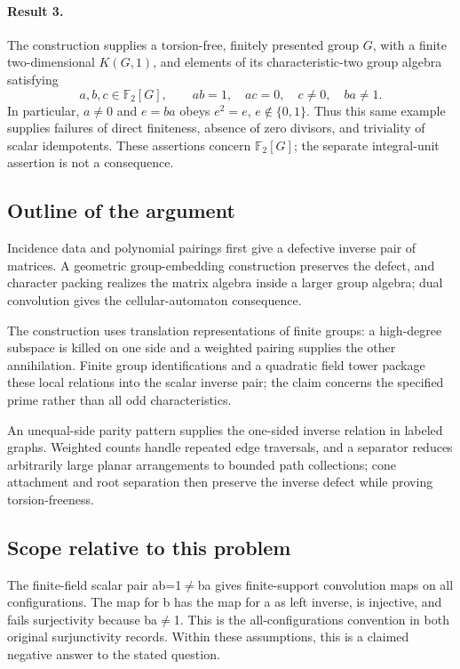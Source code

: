 \documentclass[11pt]{article}
\begin{document}
\paragraph{Result 3.} The construction supplies a torsion-free, finitely presented group \(G\), with a finite two-dimensional \(K(G,1)\), and elements of its characteristic-two group algebra satisfying
\[
 a,b,c\in\mathbb F_2[G],\qquad ab=1,\quad ac=0,\quad c\ne0,\quad ba\ne1.
\]
In particular, \(a\ne0\) and \(e=ba\) obeys \(e^2=e\), \(e\notin\{0,1\}\). Thus this same example supplies failures of direct finiteness, absence of zero divisors, and triviality of scalar idempotents. These assertions concern \(\mathbb F_2[G]\); the separate integral-unit assertion is not a consequence.

\subsection{Outline of the argument}
Incidence data and polynomial pairings first give a defective inverse pair of matrices. A geometric group-embedding construction preserves the defect, and character packing realizes the matrix algebra inside a larger group algebra; dual convolution gives the cellular-automaton consequence.

The construction uses translation representations of finite groups: a high-degree subspace is killed on one side and a weighted pairing supplies the other annihilation. Finite group identifications and a quadratic field tower package these local relations into the scalar inverse pair; the claim concerns the specified prime rather than all odd characteristics.

An unequal-side parity pattern supplies the one-sided inverse relation in labeled graphs. Weighted counts handle repeated edge traversals, and a separator reduces arbitrarily large planar arrangements to bounded path collections; cone attachment and root separation then preserve the inverse defect while proving torsion-freeness.

\subsection{Scope relative to this problem}
The finite-field scalar pair ab=1\(\neq\)ba gives finite-support convolution maps on all configurations. The map for b has the map for a as left inverse, is injective, and fails surjectivity because ba\(\neq\)1. This is the all-configurations convention in both original surjunctivity records. Within these assumptions, this is a claimed negative answer to the stated question.
\end{document}
